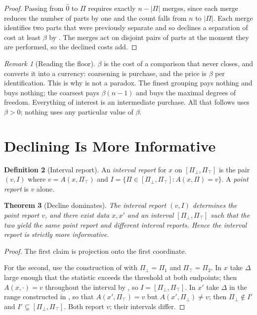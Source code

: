 \documentclass[11pt,a4paper]{article}
\newtheorem{theorem}{Theorem}[section]
\theoremstyle{definition}
\newtheorem{definition}[theorem]{Definition}
\theoremstyle{remark}
\newtheorem{remark}[theorem]{Remark}
\newcommand{\flo}{\beta}
\newcommand{\Part}{\Pi}                      %
\begin{document}
\begin{proof}
Passing from $\hat{0}$ to $\Part$ requires exactly $n - |\Part|$ merges,
since each merge reduces the number of parts by one and the count falls
from $n$ to $|\Part|$. Each merge identifies two parts that were
previously separate and so declines a separation of cost at least $\flo$
by . The merges act on disjoint pairs of parts at
the moment they are performed, so the declined costs add.
\end{proof}

\begin{remark}[Reading the floor]\label{rem:floor-reading}
$\flo$ is the cost of a comparison that never closes, and
 converts it into a currency: coarsening is purchase,
and the price is $\flo$ per identification. This is why
 is not a paradox. The finest grouping pays nothing
and buys nothing; the coarsest pays $\flo(n-1)$ and buys the maximal
degrees of freedom. Everything of interest is an intermediate purchase.
All that follows uses $\flo > 0$; nothing uses any particular value of
$\flo$.
\end{remark}

\section{Declining Is More Informative}
\label{sec:decline}

\begin{definition}[Interval report]\label{def:report}
An \emph{interval report} for $x$ on $[\Part_{\bot},\Part_{\top}]$ is the
pair $(v,I)$ where $v = A(x,\Part_{\top})$ and
$I = \{\Part \in [\Part_{\bot},\Part_{\top}] : A(x,\Part) = v\}$. A
\emph{point report} is $v$ alone.
\end{definition}

\begin{theorem}[Decline dominates]\label{thm:decline-informative}
The interval report $(v,I)$ determines the point report $v$, and there
exist data $x,x'$ and an interval $[\Part_{\bot},\Part_{\top}]$ such that
the two yield the same point report and different interval reports. Hence
the interval report is strictly more informative.
\end{theorem}

\begin{proof}
The first claim is projection onto the first coordinate.

For the second, use the construction of  with
$\Part_{\bot} = \Part_1$ and $\Part_{\top} = \Part_2$. In $x$ take
$\Delta$ large enough that the statistic exceeds the threshold at both
endpoints; then $A(x,\cdot) = v$ throughout the interval by
, so $I = [\Part_{\bot},\Part_{\top}]$. In $x'$ take
$\Delta$ in the range constructed in , so that
$A(x',\Part_{\top}) = v$ but $A(x',\Part_{\bot}) \neq v$; then
$\Part_{\bot} \notin I'$ and $I' \subsetneq [\Part_{\bot},\Part_{\top}]$.
Both report $v$; their intervals differ.
\end{proof}
\end{document}
